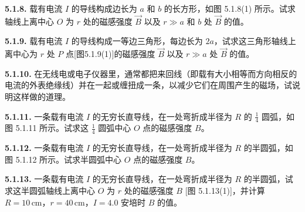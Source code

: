\begin{center}
\end{center}

\vfill
\newpage

\textbf{5.1.8.} 载有电流 $I$ 的导线构成边长为 $a$ 和 $b$ 的长方形，如图 5.1.8(1) 所示。试求轴线上离中心 $O$ 为 $r$ 处的磁感强度 $\vec{B}$ 以及 $r \gg a$ 和 $b$ 处 $\vec{B}$ 的值。

\begin{center}
\end{center}

\vfill
\newpage

\textbf{5.1.9.} 载有电流 $I$ 的导线构成一等边三角形，每边长为 $2a$，试求这三角形轴线上离中心为 $r$ 处 $P$ 点[图5.1.9(1)]的磁感强度 $\vec{B}$ 以及 $r \gg a$ 处 $\vec{B}$ 的值。

\begin{center}
\end{center}

\vfill
\newpage

\textbf{5.1.10.} 在无线电或电子仪器里，通常都把来回线（即载有大小相等而方向相反的电流的外表绝缘线）并在一起或缠扭成一条，以减少它们在周围产生的磁场，试说明这样做的道理。

\vfill
\newpage

\textbf{5.1.11.} 一条载有电流 $I$ 的无穷长直导线，在一处弯折成半径为 $R$ 的 $\displaystyle \frac{1}{4}$ 圆弧，如图 5.1.11 所示。试求这 $\displaystyle \frac{1}{4}$ 圆弧中心 $O$ 点的磁感强度 $B$。

\begin{center}
\end{center}

\vfill
\newpage

\textbf{5.1.12.} 一条载有电流 $I$ 的无穷长直导线，在一处弯折成半径为 $R$ 的半圆弧，如图 5.1.12 所示。试求半圆弧中心 $O$ 点的磁感强度 $B$。

\begin{center}
\end{center}

\vfill
\newpage

\textbf{5.1.13.} 一条载有电流 $I$ 的无穷长直导线，在一处弯折成半径为 $R$ 的半圆弧，试求这半圆弧轴线上离中心 $O$ 为 $r$ 处的磁感强度 $B$ [图 5.1.13(1)]，并计算 $R = 10\,\mathrm{cm}$，$r = 40\,\mathrm{cm}$，$I = 4.0$ 安培时 $B$ 的值。

